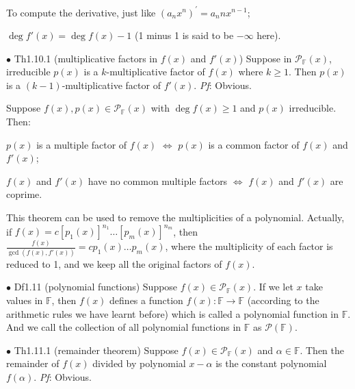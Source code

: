 \documentclass{article}
\begin{document}
\begin{Rmk}{}
    \begin{compactitem}
        \item To compute the derivative, just like $(a_nx^n)^\prime = a_nnx^{n-1}$;
        \item \textcolor{Th}{$\deg f'(x) = \deg f(x) -1$ (1 minus 1 is said to be $-\infty$ here).}
    \end{compactitem}
\end{Rmk}

\begin{Th}{$\bullet$ Th1.10.1 (multiplicative factors in $f(x)$ and $f'(x)$)}
    Suppose in $\mathcal{P}_\mathbb{F}(x)$, irreducible $p(x)$ is a $k$-multiplicative factor of $f(x)$ where $k\geq 1$. Then $p(x)$ is a $(k-1)$-multiplicative factor of $f'(x)$.
    \tcblower
    \textit{Pf}: Obvious.
\end{Th}

\begin{Rmk}{}
    \textcolor{Th}{Suppose $f(x), p(x)\in \mathcal{P}_\mathbb{F}(x)$ with $\deg f(x)\geq 1$ and $p(x)$ irreducible. Then:
    \begin{compactitem}
        \item $p(x)$ is a multiple factor of $f(x)$ $\Leftrightarrow$ $p(x)$ is a common factor of $f(x)$ and $f'(x)$;
        \item $f(x)$ and $f'(x)$ have no common multiple factors $\Leftrightarrow$ $f(x)$ and $f'(x)$ are coprime.
    \end{compactitem}}
    This theorem can be used to remove the multiplicities of a polynomial. Actually, if $f(x) = c[p_1(x)]^{n_1} \dots [p_m(x)]^{n_m}$, then $\frac{f(x)}{\gcd(f(x), f'(x))} = cp_1(x)\dots p_m(x)$, where the multiplicity of each factor is reduced to 1, and we keep all the original factors of $f(x)$.
\end{Rmk}

\begin{Df}{$\bullet$ Df1.11 (polynomial functions)}
    Suppose $f(x)\in\mathcal{P}_\mathbb{F}(x)$. If we let $x$ take values in $\mathbb{F}$, then $f(x)$ defines a function $f(x): \mathbb{F}\rightarrow\mathbb{F}$ (according to the arithmetic rules we have learnt before) which is called a polynomial function in $\mathbb{F}$. And we call the collection of all polynomial functions in $\mathbb{F}$ as $\mathcal{P}(\mathbb{F})$.
\end{Df}

\begin{Th}{$\bullet$ Th1.11.1 (remainder theorem)}
    Suppose $f(x)\in\mathcal{P}_\mathbb{F}(x)$ and $\alpha\in\mathbb{F}$. Then the remainder of $f(x)$ divided by polynomial $x-\alpha$ is the constant polynomial $f(\alpha)$.
    \tcblower
    \textit{Pf}: Obvious.
\end{Th}
\end{document}
